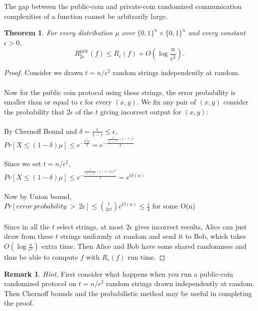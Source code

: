 \documentclass[11pt,oneside]{book}
\theoremstyle{plain}
\newtheorem{theorem}{Theorem}
\theoremstyle{definition}
\newtheorem{remark}{Remark}
\theoremstyle{plain}
\newcommand{\Rpriv}{R^{\mathrm{priv}}}
\begin{document}
The gap between the public-coin and private-coin randomized communication complexities of a function cannot be arbitrarily large. 

\begin{theorem}
	For every distribution $\mu$ over $\{0,1\}^n \times \{0,1\}^n$ and every constant $\epsilon > 0$,
	\[
	\Rpriv_{2\epsilon}(f) \le R_\epsilon(f) + O\left(\log \frac{n}{\epsilon^2}\right).
	\]
\end{theorem}

\begin{proof}
	Consider we drawn $t = n/\epsilon^2$ random strings independently at random. \\
	\\
	Now for the public coin protocol using these strings, the error probability is smaller than or equal to $\epsilon$ for every $(x,y)$. We fix any pair of $(x,y)$ consider the probability that $2\epsilon$ of the $t$ giving incorrect output for $(x,y)$:\\
	\\
	By Chernoff Bound and $\delta = \frac{\epsilon}{1-\epsilon} \leq \epsilon$,\\
	$Pr[X \leq (1-\delta)\mu] \leq e^{-\frac{\delta^2\mu}{2}} = e^{-\frac{\frac{\epsilon^2}{(1-\epsilon)^2}(1-\epsilon) t}{2}}$\\
	\\
	Since we set $t = n/\epsilon^2$,\\
	$Pr[X \leq (1-\delta)\mu] \leq e^{-\frac{\frac{\epsilon^2}{(1-\epsilon)^2}(1-\epsilon)  n/\epsilon^2}{2}} = e^{O(n)}$\\
	\\
	Now by Union bound, \\
	$Pr[error\ probability\ >\ 2\epsilon] \leq \binom{t}{2\epsilon t}e^{O(n)} \leq \frac14$ for some O(n)\\
	\\
	Since in all the $t$ select strings, at most $2\epsilon$ gives incorrect results, Alice can just draw from these $t$ strings uniformly at random and send it to Bob, which takes $O(\log \frac{n}{\epsilon^2})$ extra time. Then Alice and Bob have some shared randomness and thus be able to compute $f$ with $R_\epsilon(f)$ run time.
\end{proof}

\bigskip
\begin{remark}
	\emph{Hint.} First consider what happens when you run a public-coin randomized protocol on $t = n/\epsilon^2$ random strings drawn independently at random. Then Chernoff bounds and the probabilistic method may be useful in completing the proof.
\end{remark}
\end{document}
